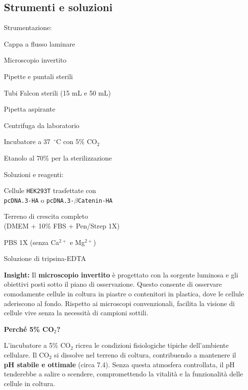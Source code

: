 \subsection{Strumenti e soluzioni}
\twoColumnLayout
  {Strumentazione:}
  {
  \item Cappa a flusso laminare
  \item Microscopio invertito
  \item Pipette e puntali sterili
  \item Tubi Falcon sterili (15 mL e 50 mL)
  \item Pipetta aspirante
  \item Centrifuga da laboratorio
  \item Incubatore a 37~$^\circ$C con 5\% CO$_2$
  \item Etanolo al 70\% per la sterilizzazione
  }
  {Soluzioni e reagenti:}
  {
  \item Cellule \texttt{HEK293T} trasfettate con\\ \texttt{pcDNA.3-HA} o \texttt{pcDNA.3-$\beta$Catenin-HA}
  \item Terreno di crescita completo\\ (DMEM + 10\% FBS + Pen/Strep 1X)
  \item PBS 1X (senza Ca$^{2+}$ e Mg$^{2+}$)
  \item Soluzione di tripsina-EDTA
  }
\vspace{1em}
\begin{insightBox}
  \textbf{Insight:} Il \textbf{microscopio invertito} è progettato con la sorgente luminosa e gli obiettivi posti sotto il piano di osservazione. Questo consente di osservare comodamente cellule in coltura in piastre o contenitori in plastica, dove le cellule aderiscono al fondo. Rispetto ai microscopi convenzionali, facilita la visione di cellule vive senza la necessità di campioni sottili.
\end{insightBox}
\begin{percheBox}
  \textbf{Perché 5\% CO$_2$?}

  L’incubatore a 5\% CO$_2$ ricrea le condizioni fisiologiche tipiche dell’ambiente cellulare. Il CO$_2$ si dissolve nel terreno di coltura, contribuendo a mantenere il \textbf{pH stabile e ottimale} (circa 7.4). Senza questa atmosfera controllata, il pH tenderebbe a salire o scendere, compromettendo la vitalità e la funzionalità delle cellule in coltura.
\end{percheBox}

